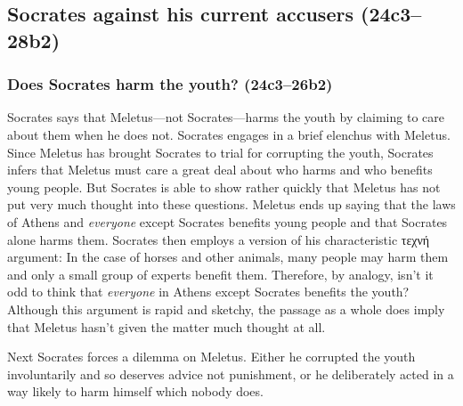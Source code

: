 \documentclass[11pt]{article}
\begin{document}



\subsection{Socrates against his current accusers (24c3--28b2)}

\subsubsection{Does Socrates harm the youth? (24c3--26b2)}

Socrates says that Meletus---not Socrates---harms the youth by claiming to
care about them when he does not. Socrates engages in a brief elenchus with
Meletus.  Since Meletus has brought Socrates to trial for corrupting the
youth, Socrates infers that Meletus must care a great deal about who harms
and who benefits young people. But Socrates is able to show rather quickly
that Meletus has not put very much thought into these questions.  Meletus
ends up saying that the laws of Athens and \emph{everyone} except Socrates
benefits young people and that Socrates alone harms them.  Socrates then
employs a version of his characteristic {\g τεχνή} argument: In the case of
horses and other animals, many people may harm them and only a small group
of experts benefit them.  Therefore, by analogy, isn't it odd to think that
\emph{everyone} in Athens except Socrates benefits the youth?  Although
this argument is rapid and sketchy, the passage as a whole does imply that
Meletus hasn't given the matter much thought at all.

Next Socrates forces a dilemma on Meletus. Either he corrupted the youth
involuntarily and so deserves advice not punishment, or he deliberately
acted in a way likely to harm himself which nobody does.
\end{document}
